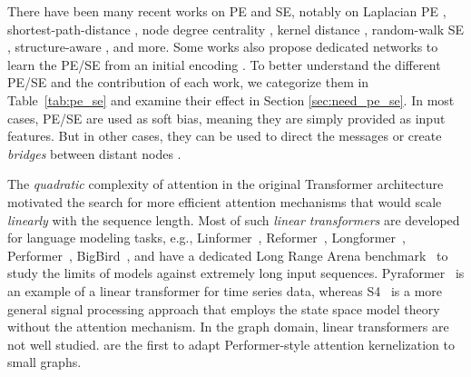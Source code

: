 \documentclass{article}
\begin{document}
There have been many recent works on PE and SE, notably on Laplacian PE \cite{dwivedi2020generalization,kreuzer2021rethinking, beaini2021directional_dgn,wang2022equivstable,lim2022sign}, shortest-path-distance \cite{li2020distance,ying2021graphormer}, node degree centrality \cite{ying2021graphormer}, kernel distance \cite{mialon2021graphit}, random-walk SE \cite{dwivedi2022LPE}, structure-aware \cite{chen2022SAT, bouritsas2022improving_GSN,bodnar2021weisfeiler_CIN}, and more. Some works also propose dedicated networks to learn the PE/SE from an initial encoding \cite{kreuzer2021rethinking, dwivedi2022LPE, lim2022sign, chen2022SAT}. To better understand the different PE/SE and the contribution of each work, we categorize them in Table~\ref{tab:pe_se} and examine their effect in Section \ref{sec:need_pe_se}. In most cases, PE/SE are used as soft bias, meaning they are simply provided as input features. But in other cases, they can be used to direct the messages \cite{beaini2021directional_dgn} or create \textit{bridges} between distant nodes \cite{koutis2019spectral, topping2021understanding_ricci}.

The \emph{quadratic} complexity of attention in the original Transformer architecture~\cite{vaswani2017attention} motivated the search for more efficient attention mechanisms that would scale \emph{linearly} with the sequence length. 
Most of such \emph{linear transformers} are developed for language modeling tasks, e.g., Linformer~\cite{Wang2020LinformerSW}, Reformer~\cite{DBLP:conf/iclr/KitaevKL20}, Longformer~\cite{DBLP:journals/corr/abs-2004-05150}, Performer~\cite{DBLP:conf/iclr/ChoromanskiLDSG21}, BigBird~\cite{DBLP:conf/nips/ZaheerGDAAOPRWY20}, and have a dedicated Long Range Arena benchmark~\cite{tay2021long} to study the limits of models against extremely long input sequences.
Pyraformer~\cite{liu2022pyraformer} is an example of a linear transformer for time series data, whereas S4~\cite{gu2022efficiently} is a more general signal processing approach that employs the state space model theory without the attention mechanism. 
In the graph domain, linear transformers are not well studied. \citet{choromanski2021blocktoeplitz} are the first to adapt Performer-style attention kernelization to small graphs.


\vspace{-3pt}
\end{document}
